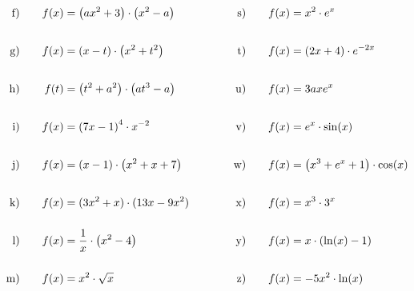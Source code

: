 \begin{exercise}
\begin{alignat*}{5}
        \text{f)\vstrut}&\quad & \xcf & \quad&\quad & \text{s)\vstrut}&\quad & \xcs \\
        \text{g)\vstrut}&\quad & \xcg & \quad&\quad & \text{t)\vstrut}&\quad & \xct \\
        \text{h)\vstrut}&\quad & \xch & \quad&\quad & \text{u)\vstrut}&\quad & \xcu \\
        \text{i)\vstrut}&\quad & \xci & \quad&\quad & \text{v)\vstrut}&\quad & \xcv \\
        \text{j)\vstrut}&\quad & \xcj & \quad&\quad & \text{w)\vstrut}&\quad & \xcw \\
        \text{k)\vstrut}&\quad & \xck & \quad&\quad & \text{x)\vstrut}&\quad & \xcx \\
        \text{l)\vstrut}&\quad & \xcl & \quad&\quad & \text{y)\vstrut}&\quad & \xcy \\
        \text{m)\vstrut}&\quad & \xcm & \quad&\quad & \text{z)\vstrut}&\quad & \xcz
      \end{alignat*}
    \endgroup
  \fi
\end{exercise}

